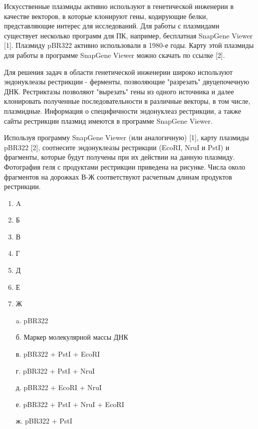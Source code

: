 
Искусственные плазмиды активно используют в генетической инженерии в качестве векторов, в которые клонируют гены, кодирующие белки, представляющие интерес для исследований. Для работы с плазмидами существует несколько программ для ПК, например, бесплатная SnapGene Viewer [1].
Плазмиду pBR322 активно использовали в 1980-е годы. Карту этой плазмиды для работы в программе SnapGene Viewer можно скачать по ссылке [2]. 

Для решения задач в области генетической инженерии широко используют эндонуклеазы рестрикции - ферменты, позволяющие "разрезать" двуцепочечную ДНК. Рестриктазы позволяют "вырезать" гены из одного источника и далее клонировать полученные последовательности в различные векторы, в том числе, плазмидные. Информация о специфичности эндонуклеаз рестрикции, а также сайты рестрикции плазмид имеются в программе SnapGene Viewer.

Используя программу SnapGene Viewer (или аналогичную) [1], карту плазмиды pBR322 [2], соотнесите эндонуклеазы рестрикции (EcoRI, NruI и PstI) и фрагменты, которые будут получены при их действии на данную плазмиду. Фотография геля с продуктами рестрикции приведена на рисунке. Числа около фрагментов на дорожках В-Ж соответствуют расчетным длинам продуктов рестрикции.


        \begin{enumerate}
            \item A
            \item Б
            \item В
            \item Г
            \item Д
            \item Е
            \item Ж
        \end{enumerate}

        \begin{enumerate}
            \item[a.] pBR322
            \item[б.] Маркер молекулярной массы ДНК
            \item[в.] pBR322 + PstI + EcoRI
            \item[г.]  pBR322 + PstI + NruI
            \item[д.] pBR322 + EcoRI + NruI
            \item[е.] pBR322 + PstI + NruI + EcoRI
            \item[ж.] pBR322 + PstI
        \end{enumerate}


